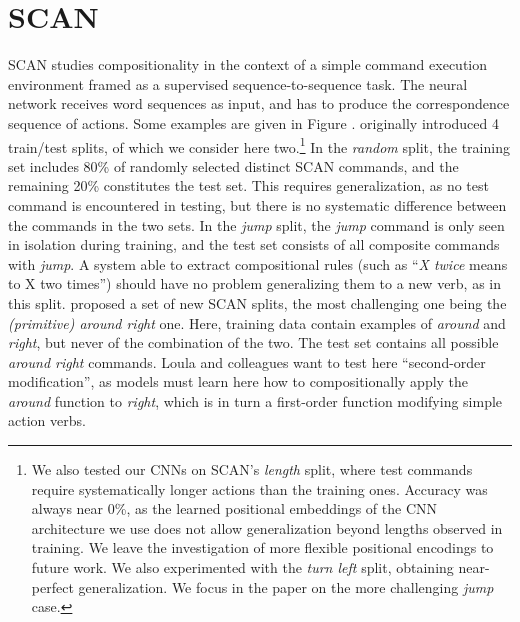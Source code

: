 \section{SCAN}
\label{sec:setup}

SCAN studies compositionality in the context of a simple command
execution environment framed as a supervised sequence-to-sequence
task. The neural network receives word sequences as input, and has to
produce the correspondence sequence of actions. Some examples are
given in Figure .  originally introduced 4
train/test splits, of which we consider here two.\footnote{We also
  tested our CNNs on SCAN's \emph{length} split, where test commands
  require systematically longer actions than the training
  ones. Accuracy was always near 0\%, as the learned positional
  embeddings of the CNN architecture we use does not allow
  generalization beyond lengths observed in training. We leave the
  investigation of more flexible positional encodings \cite[as in,
  e.g.,][]{vaswani:etal:2017} to future work. We also experimented
  with the \emph{turn left} split, obtaining near-perfect
  generalization. We focus in the paper on the more challenging
  \emph{jump} case.} In the \emph{random} split, the training set
includes 80\% of randomly selected distinct SCAN commands, and the
remaining 20\% constitutes the test set. This requires generalization,
as no test command is encountered in testing, but there is no
systematic difference between the commands in the two sets.  In the
\emph{jump} split, the \emph{jump} command is only seen in isolation
during training, and the test set consists of all composite commands
with \emph{jump}. A system able to extract compositional rules (such
as ``\emph{X twice} means to X two times'') should have no problem
generalizing them to a new verb, as in this
split.  proposed a set of new SCAN splits,
the most challenging one being the \emph{(primitive) around right}
one.  Here, training data contain examples of \emph{around} and
\emph{right}, but never of the combination of the two. The test set
contains all possible \emph{around right} commands. Loula and
colleagues want to test here ``second-order modification'', as models
must learn here how to compositionally apply the \emph{around}
function to \emph{right}, which is in turn a first-order function
modifying simple action verbs.


